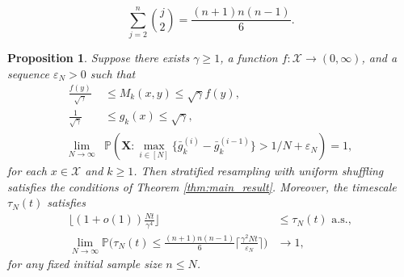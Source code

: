 \documentclass[10pt,a4paper]{amsart}
\newtheorem{prop}{Proposition}
\newcommand{\bbP}{\mathbb{P}}
\newcommand{\bfX}{\mathbf{X}}
\newcommand{\calX}{\mathcal{X}}
\begin{document}
\begin{equation}\label{binomial_sum}
\sum_{j = 2}^n \binom{j}{2} = \frac{(n + 1) n (n - 1)}{6}.
\end{equation}

\begin{prop}\label{prop:stratified}
Suppose there exists $\gamma \geq 1$, a function $f : \calX \to ( 0, \infty )$, and a sequence $\varepsilon_N > 0$ such that
\begin{align}
\frac{ f( y ) }{ \sqrt{ \gamma } } &\leq M_k( x, y ) \leq \sqrt{ \gamma } f( y ), \label{eq:m_mixing} \\
\frac{ 1 }{ \sqrt{ \gamma } } &\leq g_k( x ) \leq \sqrt{ \gamma }, \label{eq:uniform_weight_bound} \\
\lim_{ N \to \infty } &\bbP( \bfX : \max_{ i \in [ N ] }\{ \bar{ g }_k^{ ( i ) } - \bar{g}_k^{ ( i - 1 ) } \} > 1 / N + \varepsilon_N ) = 1, \label{eq:environment}
\end{align}
for each $x \in \calX$ and $k \geq 1$.
Then stratified resampling with uniform shuffling satisfies the conditions of Theorem \ref{thm:main_result}.
Moreover, the timescale $\tau_N(t)$ satisfies
\begin{align}
\Big\lfloor (1 + o(1)) \frac{N t}{\gamma^4} \Big\rfloor &\leq \tau_N(t) \text{ a.s.}, \label{stratified_timescale_lb}\\
\lim_{N \to \infty} \bbP\Bigg( \tau_N(t) \leq \frac{(n + 1) n (n - 1)}{6} \Big\lceil \frac{\gamma^2 N t}{\varepsilon_N} \Big\rceil \Bigg) &\to 1, \label{stratified_timescale_ub}
\end{align}
for any fixed initial sample size $n \leq N$.
\end{prop}
\end{document}
